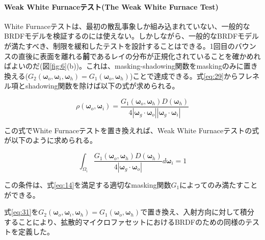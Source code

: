 \documentclass[a4j,xelatex,ja=standard]{bxjsarticle}
\begin{document}
\paragraph{Weak White Furnaceテスト(The Weak White Furnace Test)}

White Furnaceテストは、最初の散乱事象しか組み込まれていない、一般的なBRDFモデルを検証するのには使えない。しかしながら、一般的なBRDFモデルが満たすべき、制限を緩和したテストを設計することはできる。1回目のバウンスの直後に表面を離れる\textbf{前}であるレイの分布が正規化されていることを確かめればよいのだ(図\ref{fig:6}(b))。これは、masking-shadowing関数をmaskingのみに置き換える($G_2(\boldsymbol{\omega}_o, \boldsymbol{\omega}_i, \boldsymbol{\omega}_h) = G_1(\boldsymbol{\omega}_o, \boldsymbol{\omega}_h)$)ことで達成できる。式\eqref{eq:29}からフレネル項とshadowing関数を除けば以下の式が求められる。

\begin{equation}
    \rho(\boldsymbol{\omega}_o, \boldsymbol{\omega}_i) = \frac{G_1(\boldsymbol{\omega}_o, \boldsymbol{\omega}_h) D(\boldsymbol{\omega}_h)}{4|\boldsymbol{\omega}_g \cdot \boldsymbol{\omega}_o| |\boldsymbol{\omega}_g \cdot \boldsymbol{\omega}_i|}
    \label{eq:35}
\end{equation}

この式でWhite Furnaceテストを置き換えれば、Weak White Furnaceテストの式が以下のように求められる。

\begin{equation}
    \boxed{
    \int_{\Omega_i} \frac{G_1(\boldsymbol{\omega}_o, \boldsymbol{\omega}_h) D(\boldsymbol{\omega}_h)}{4|\boldsymbol{\omega}_g \cdot \boldsymbol{\omega}_o|} d\boldsymbol{\omega}_i = 1
    }
    \label{eq:36}
\end{equation}

この条件は、式\eqref{eq:14}を満足する適切なmasking関数$G_1$によってのみ満たすことができる。

式\eqref{eq:31}を$G_2(\boldsymbol{\omega}_o, \boldsymbol{\omega}_i, \boldsymbol{\omega}_h) = G_1(\boldsymbol{\omega}_o, \boldsymbol{\omega}_h)$で置き換え、入射方向に対して積分することにより、拡散的マイクロファセットにおけるBRDFのための同様のテストを定義した。
\end{document}
